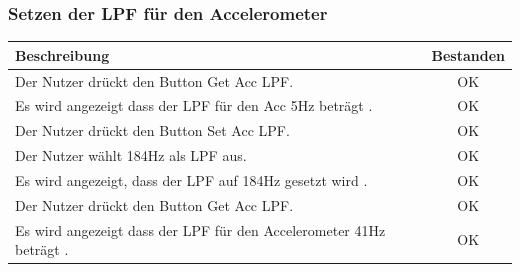 \documentclass[a4paper,12pt]{article}
\newcommand{\testok}[0]{
	\cellcolor{green!25} OK
}
\begin{document}
\subsubsection{Setzen der LPF für den Accelerometer}
\begin{tabular}{ | p{12cm} | c| }
	\hline
	\textbf{Beschreibung} & \textbf{Bestanden}\\
	\hline
	Der Nutzer drückt den Button \glqq{}Get Acc LPF\grqq{}. & \testok \\
	\hline
	Es wird angezeigt dass der LPF für den Acc 5Hz beträgt . & \testok \\
	\hline
	Der Nutzer drückt den Button \glqq{}Set Acc LPF\grqq{}. & \testok \\
	\hline
	Der Nutzer wählt 184Hz als LPF aus. & \testok \\
	\hline
	Es wird angezeigt, dass der LPF auf 184Hz gesetzt wird . & \testok \\
	\hline
	Der Nutzer drückt den Button \glqq{}Get Acc LPF\grqq{}. & \testok \\
	\hline
	Es wird angezeigt dass der LPF für den Accelerometer 41Hz beträgt . & \testok \\
	\hline
\end{tabular}
\\ \\ \\ \\
\begin{figure}[h]
	\centering
\end{figure}
\FloatBarrier
\end{document}
